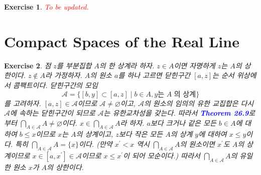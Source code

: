 \documentclass{article}
\newtheorem{exercise}{Exercise}[section]
\begin{document}
\begin{exercise}
    \textcolor{red}{To be updated.}
\end{exercise}

\section{Compact Spaces of the Real Line}

\begin{exercise}
    점 $z$를 부분집합 $A$의 한 상계라 하자. $z\in A$이면 자명하게 $z$는 $A$의 상한이다. $z\notin A$라 가정하자. $A$의 원소 $a$를 하나 고르면 닫힌구간 $[a,z]$는 순서 위상에서 콤팩트이다. 닫힌구간의 모임
    \[
        \mathcal{A}=\{[b,y]\subset[a,z]\mid b\in A,y\text{는 }A\text{ 의 상계}\}
    \]
    를 고려하자. $[a,z]\in\mathcal{A}$이므로 $\mathcal{A}\ne\varnothing$이고, $\mathcal{A}$의 원소의 임의의 유한 교집합은 다시 $\mathcal{A}$에 속하는 닫힌구간이 되므로 $\mathcal{A}$는 유한교차성을 갖는다. 따라서 \textcolor{blue}{\textbf{Theorem 26.9}}로부터 $\bigcap_{A\in\mathcal{A}}A\ne\varnothing$이다. $x\in\bigcap_{A\in\mathcal{A}}A$라 하자. $a$보다 크거나 같은 모든 $b\in A$에 대하여 $b\leq x$이므로 $x$는 $A$의 상계이고, $z$보다 작은 모든 $A$의 상계 $y$에 대하여 $x\leq y$이다. 특히 $\bigcap_{A\in\mathcal{A}}A=\{x\}$이다. (만약 $x^\prime<x$ 역시 $\bigcap_{A\in\mathcal{A}}A$의 원소이면 $x^\prime$도 $A$의 상계이므로 $x\in[a,x^\prime]\in\mathcal{A}$이므로 $x\leq x^\prime$이 되어 모순이다.) 따라서 $\bigcap_{A\in\mathcal{A}}A$의 유일한 원소 $x$가 $A$의 상한이다.
\end{exercise}
\end{document}
